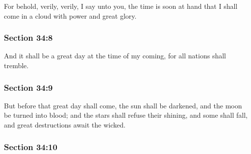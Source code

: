 		For behold, verily, verily, I say unto you, the time is soon at hand that I shall come in a cloud with power and great glory.


	\subsubsection{Section 34:8} %
		\label{DC34-8}

		And it shall be a great day at the time of my coming, for all nations shall tremble.


	\subsubsection{Section 34:9} %
		\label{DC34-9}

		But before that great day shall come, the sun shall be darkened, and the moon be turned into blood; and the stars shall refuse their shining, and some shall fall, and great destructions await the wicked.


	\subsubsection{Section 34:10} %
		\label{DC34-10}

